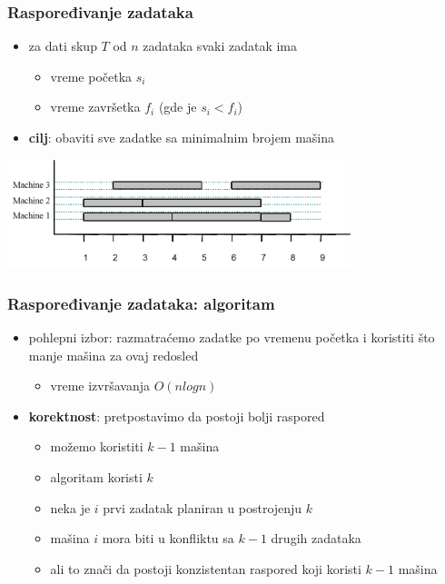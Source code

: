 \documentclass[compress]{beamer}
\begin{document}
\begin{frame}[fragile]
  \frametitle{Raspoređivanje zadataka}
  \begin{itemize}
    \item za dati skup $T$ od $n$ zadataka svaki zadatak ima
    \begin{itemize}
      \item vreme početka $s_{i}$
      \item vreme završetka $f_{i}$ (gde je $s_{i}<f_{i}$)
    \end{itemize}
    \item \textbf{cilj}: obaviti sve zadatke sa minimalnim brojem mašina
  \end{itemize}
  \begin{center}
    \includegraphics[width=10cm]{asp-13-pic17.png}
  \end{center}
\end{frame}

\begin{frame}[fragile]
  \frametitle{Raspoređivanje zadataka: algoritam}
  \begin{itemize}
    \item pohlepni izbor: razmatraćemo zadatke po vremenu početka i
    koristiti što manje mašina za ovaj redosled
    \begin{itemize}
      \item vreme izvršavanja $O(n log n)$
    \end{itemize}
    \item \textbf{korektnost}: pretpostavimo da postoji bolji raspored
    \begin{itemize}
      \item možemo koristiti $k-1$ mašina
      \item algoritam koristi $k$
      \item neka je $i$ prvi zadatak planiran u postrojenju $k$
      \item mašina $i$ mora biti u konfliktu sa $k-1$ drugih zadataka
      \item ali to znači da postoji konzistentan raspored koji koristi
      $k-1$ mašina
    \end{itemize}
  \end{itemize}
\end{frame}
\end{document}
